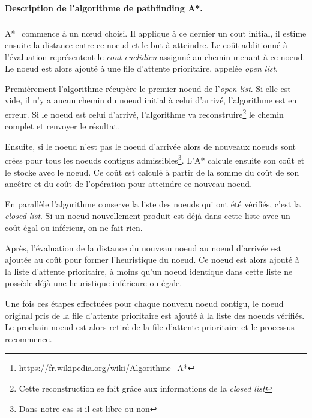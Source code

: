\documentclass[a4paper,10pt]{report}
\begin{document}
\begin{spacing}{1.5}
\paragraph{Description de l'algorithme de pathfinding A*.}
A*\footnote{\url{https://fr.wikipedia.org/wiki/Algorithme_A*}} commence à un
nœud choisi. Il applique à ce dernier un cout initial, il estime ensuite la
distance entre ce noeud et le but à atteindre. Le coût additionné à l'évaluation
représentent le \textit{cout euclidien} assignné au chemin menant à ce noeud.
Le noeud est alors ajouté à une file d'attente prioritaire, appelée \textit{open
list}.

Premièrement l'algorithme récupère le premier noeud de l'\textit{open list}. Si
elle est vide, il n'y a aucun chemin du noeud initial à celui d'arrivé,
l'algorithme est en erreur. Si le noeud est celui d'arrivé, l'algorithme va
reconstruire\footnote{Cette reconstruction se fait grâce aux informations de la
  \textit{closed list}} le chemin complet et renvoyer le résultat.

Ensuite, si le noeud n'est pas le noeud d'arrivée alors de nouveaux noeuds sont
crées pour tous les noeuds contigus admissibles\footnote{Dans notre cas si il
  est libre ou non}. L'A$\ast$ calcule ensuite son coût et le stocke avec le
noeud. Ce coût est calculé à partir de la somme du coût de son ancêtre et du
coût de l'opération pour atteindre ce nouveau noeud.

En parallèle l'algorithme conserve la liste des noeuds qui ont été vérifiés,
c'est la \textit{closed list}. Si un noeud nouvellement produit est déjà dans
cette liste avec un coût égal ou inférieur, on ne fait rien.

Après, l'évaluation de la distance du nouveau noeud au noeud d'arrivée est ajoutée
au coût pour former l'heuristique du noeud. Ce noeud est alors ajouté à la liste
d'attente prioritaire, à moins qu'un noeud identique dans cette liste ne possède
déjà une heuristique inférieure ou égale.

Une fois ces étapes effectuées pour chaque nouveau noeud contigu, le noeud
original pris de la file d'attente prioritaire est ajouté à la liste des noeuds
vérifiés. Le prochain noeud est alors retiré de la file d'attente prioritaire et
le processus recommence.


\end{spacing}
\end{document}
